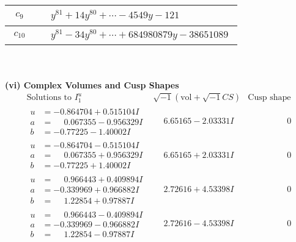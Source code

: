 \documentclass[1p]{elsarticle_modified}
\theoremstyle{definition}
\newcommand{\I}{\sqrt{-1}}
\begin{document}
\begin{tabular}{m{50pt}|m{274pt}}
\hline $$\begin{aligned}c_{9}\end{aligned}$$&$\begin{aligned}
&y^{81}+14 y^{80}+\cdots-4549 y-121
\end{aligned}$\\
\hline $$\begin{aligned}c_{10}\end{aligned}$$&$\begin{aligned}
&y^{81}-34 y^{80}+\cdots+684980879 y-38651089
\end{aligned}$\\
\hline
\end{tabular}\\~\\
\newpage\flushleft \textbf{(vi) Complex Volumes and Cusp Shapes}
$$\begin{array}{c|c|c}  
\text{Solutions to }I^u_{1}& \I (\text{vol} + \sqrt{-1}CS) & \text{Cusp shape}\\
 \hline 
\begin{aligned}
u &= -0.864704 + 0.515104 I \\
a &= \phantom{-}0.067355 - 0.956329 I \\
b &= -0.77225 - 1.40002 I\end{aligned}
 & \phantom{-}6.65165 - 2.03331 I & \phantom{-0.000000 } 0 \\ \hline\begin{aligned}
u &= -0.864704 - 0.515104 I \\
a &= \phantom{-}0.067355 + 0.956329 I \\
b &= -0.77225 + 1.40002 I\end{aligned}
 & \phantom{-}6.65165 + 2.03331 I & \phantom{-0.000000 } 0 \\ \hline\begin{aligned}
u &= \phantom{-}0.966443 + 0.409894 I \\
a &= -0.339969 + 0.966882 I \\
b &= \phantom{-}1.22854 + 0.97887 I\end{aligned}
 & \phantom{-}2.72616 + 4.53398 I & \phantom{-0.000000 } 0 \\ \hline\begin{aligned}
u &= \phantom{-}0.966443 - 0.409894 I \\
a &= -0.339969 - 0.966882 I \\
b &= \phantom{-}1.22854 - 0.97887 I\end{aligned}
 & \phantom{-}2.72616 - 4.53398 I & \phantom{-0.000000 } 0 \\ \hline\begin{aligned}

\end{aligned}
\end{array}$$
\end{document}
